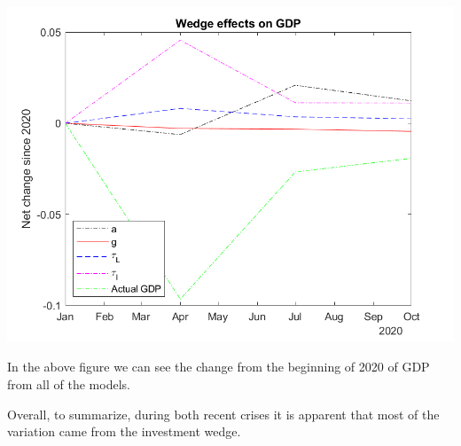\documentclass[11pt]{article} %
\begin{document}
\includegraphics{wedgescovdiff}

In the above figure we can see the change from the beginning of 2020 of GDP from all of the models. 

Overall, to summarize, during both recent crises it is apparent that most of the variation came from the investment wedge.  

\end{document}
